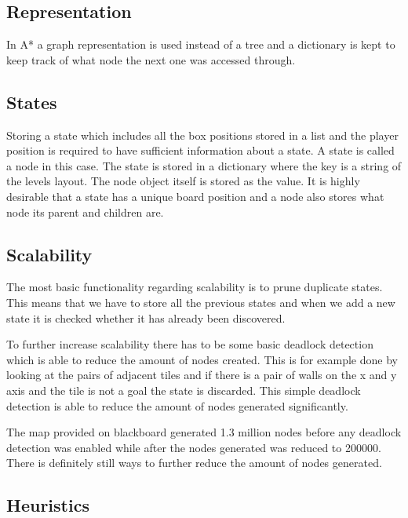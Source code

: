 \documentclass[../../maint.tex]{subfiles}
\begin{document}
\subsection{Representation}

In A* a graph representation is used instead of a tree and a dictionary is kept to keep track of what node the next one was accessed through.

\subsection{States}

Storing a state which includes all the box positions stored in a list and the player position is required to have 				sufficient 	information about a state. A state is called a node in this case. The state is stored in a dictionary where 		the key is a string of the levels layout. The node object itself is stored as the value. It is highly desirable that a 			state has a unique board position and a node also stores what node its parent and children are. 

\subsection{Scalability}

The most basic functionality regarding scalability is to prune duplicate states. This means that we have to store all the 		previous states and when we add a new state it is checked whether it has already been discovered.
	
	
To further increase scalability there has to be some basic deadlock detection which is able to reduce the amount of nodes 		created. This is for example done by looking at the pairs of adjacent tiles and if there is a pair of walls on the x and y 	axis and the tile is not a goal the state is discarded. This simple deadlock detection is able to reduce the amount of 			nodes generated significantly. 
	
The map provided on blackboard generated 1.3 million nodes before any deadlock detection was enabled while after the nodes 	generated was reduced to 200000. There is definitely still ways to further reduce the amount of nodes generated.

\subsection{Heuristics}
\end{document}
